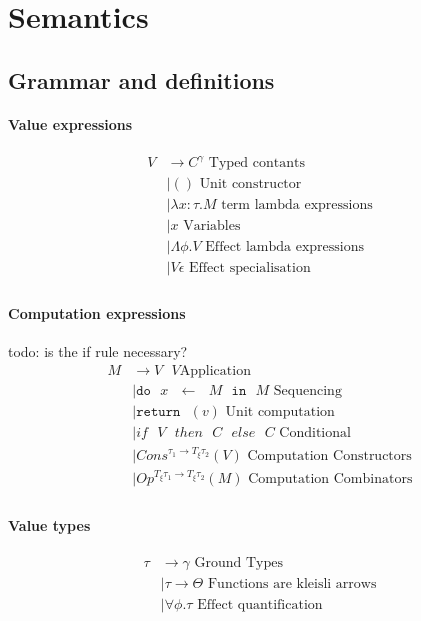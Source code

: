 \documentclass[twoside,a4paper,11pt]{article}
\newcommand{\s}{\mbox{ }}
\newcommand{\doExpr}[3]{\texttt{do} \s #1\s \leftarrow \s #2 \s \texttt{in} \s #3}
\newcommand{\ret}[1]{\texttt{return} \s (#1)}
\begin{document}
\section{Semantics}
\subsection{Grammar and definitions}

\paragraph{Value expressions}

\begin{equation}
\label{PDefifinition}
\begin{split}
V  &\rightarrow C^{\gamma} \mbox{ Typed contants}\\
&\mid () \mbox{ Unit constructor}\\
&\mid \lambda x: \tau. M \mbox{ term lambda expressions}\\
&\mid x \mbox{ Variables}\\
&\mid \Lambda \phi. V \mbox{ Effect lambda expressions}\\
&\mid V \epsilon \mbox{ Effect specialisation}\\
\end{split}
\end{equation} 

\paragraph{Computation expressions}
todo: is the if rule necessary?
\begin{equation}
\label{PDefifinition}
\begin{split}
M & \rightarrow V \s V \mbox{Application}\\
&\mid \doExpr{x}{M}{M} \mbox{ Sequencing}\\
&\mid \ret{v}\mbox{ Unit computation}\\
&\mid if\s V\s then\s C \s else \s C \mbox{ Conditional}\\
&\mid Cons^{\tau_1 \rightarrow T_{\xi} \tau_2}(V) \mbox{ Computation Constructors}\\
&\mid Op^{T_{\xi} \tau_1 \rightarrow T_{\xi} \tau_2}(M) \mbox{ Computation Combinators}\\
\end{split}
\end{equation} 

\paragraph{Value types}
\begin{equation}
\label{PDefifinition}
\begin{split}
\tau & \rightarrow \gamma \mbox{ Ground Types}\\
&\mid \tau \rightarrow \Theta \mbox{ Functions are kleisli arrows}\\
&\mid \forall \phi. \tau \mbox{ Effect quantification}\\
\end{split}
\end{equation} 
\end{document}
